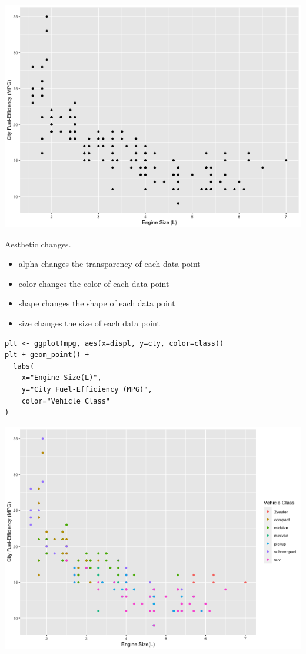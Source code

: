 \documentclass[11pt]{article}
\begin{document}
\begin{org}
\begin{center}
\includegraphics[width=.9\linewidth]{./resources/mpg_dots.png}
\end{center}
\end{org}

Aesthetic changes.

\begin{itemize}
\item alpha changes the transparency of each data point
\item color changes the color of each data point
\item shape changes the shape of each data point
\item size changes the size of each data point
\end{itemize}

\begin{verbatim}
plt <- ggplot(mpg, aes(x=displ, y=cty, color=class))
plt + geom_point() +
  labs(
    x="Engine Size(L)",
    y="City Fuel-Efficiency (MPG)",
    color="Vehicle Class"
)
\end{verbatim}

\begin{org}
\begin{center}
\includegraphics[width=.9\linewidth]{./resources/mpg_dots2.png}
\end{center}
\end{org}
\end{document}
